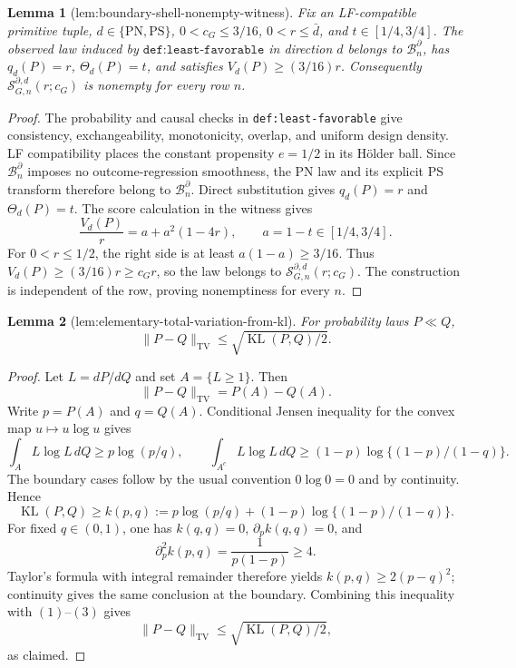 \documentclass{article}
\newtheorem{lemma}{Lemma}
\begin{document}
\begin{lemma}[lem:boundary-shell-nonempty-witness]\label{lem:boundary-shell-nonempty-witness}
Fix an LF-compatible primitive tuple, \(d\in\{\mathrm{PN},\mathrm{PS}\}\), \(0<c_G\le3/16\), \(0<r\le\bar d\), and \(t\in[1/4,3/4]\). The observed law induced by \(\texttt{def:least-favorable}\) in direction \(d\) belongs to \(\mathcal B_n^\partial\), has \(q_d(P)=r\), \(\Theta_d(P)=t\), and satisfies \(V_d(P)\ge(3/16)r\). Consequently \(\mathcal S_{G,n}^{\partial,d}(r;c_G)\) is nonempty for every row \(n\).
\end{lemma}
\begin{proof}
The probability and causal checks in \texttt{def:least-favorable} give consistency, exchangeability, monotonicity, overlap, and uniform design density. LF compatibility places the constant propensity \(e=1/2\) in its H\"older ball. Since \(\mathcal B_n^\partial\) imposes no outcome-regression smoothness, the PN law and its explicit PS transform therefore belong to \(\mathcal B_n^\partial\). Direct substitution gives \(q_d(P)=r\) and \(\Theta_d(P)=t\). The score calculation in the witness gives
\[\frac{V_d(P)}r=a+a^2(1-4r),\qquad a=1-t\in[1/4,3/4].\tag{1}\]
For \(0<r\le1/2\), the right side is at least \(a(1-a)\ge3/16\). Thus \(V_d(P)\ge(3/16)r\ge c_Gr\), so the law belongs to \(\mathcal S_{G,n}^{\partial,d}(r;c_G)\). The construction is independent of the row, proving nonemptiness for every \(n\).
\end{proof}

\begin{lemma}[lem:elementary-total-variation-from-kl]\label{lem:elementary-total-variation-from-kl}
For probability laws \(P\ll Q\),
\[\lVert P-Q\rVert_{\mathrm{TV}}\le\sqrt{\operatorname{KL}(P,Q)/2}.\]
\end{lemma}
\begin{proof}
Let \(L=dP/dQ\) and set \(A=\{L\ge1\}\). Then
\[\lVert P-Q\rVert_{\mathrm{TV}}=P(A)-Q(A).\tag{1}\]
Write \(p=P(A)\) and \(q=Q(A)\). Conditional Jensen inequality for the convex map \(u\mapsto u\log u\) gives
\[\int_A L\log L\,dQ\ge p\log(p/q),\qquad \int_{A^c}L\log L\,dQ\ge(1-p)\log\{(1-p)/(1-q)\}.\tag{2}\]
The boundary cases follow by the usual convention \(0\log0=0\) and by continuity. Hence
\[\operatorname{KL}(P,Q)\ge k(p,q):=p\log(p/q)+(1-p)\log\{(1-p)/(1-q)\}.\tag{3}\]
For fixed \(q\in(0,1)\), one has \(k(q,q)=0\), \(\partial_pk(q,q)=0\), and
\[\partial_p^2k(p,q)=\frac1{p(1-p)}\ge4.\tag{4}\]
Taylor's formula with integral remainder therefore yields \(k(p,q)\ge2(p-q)^2\); continuity gives the same conclusion at the boundary. Combining this inequality with \((1)\)--\((3)\) gives
\[\lVert P-Q\rVert_{\mathrm{TV}}\le\sqrt{\operatorname{KL}(P,Q)/2},\]
as claimed.
\end{proof}
\end{document}
